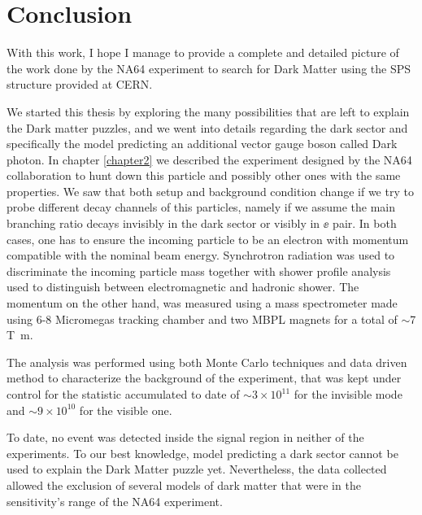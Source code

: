
\chapter{Conclusion} %

\label{chapter6}

With this work, I hope I manage to provide a complete and detailed picture of the work done by the NA64 experiment to search for Dark Matter using the SPS structure provided at CERN.

We started this thesis by exploring the many possibilities that are left to explain the Dark matter puzzles, and we went into details regarding the dark sector and specifically the model predicting an additional vector gauge boson called Dark photon. In chapter \ref{chapter2} we described the experiment designed by the NA64 collaboration to hunt down this particle and possibly other ones with the same properties. We saw that both setup and background condition change if we try to probe different decay channels of this particles, namely if we assume the main branching ratio decays invisibly in the dark sector or visibly in $\ee$ pair. In both cases, one has to ensure the incoming particle to be an electron with momentum compatible with the nominal beam energy. Synchrotron radiation was used to discriminate the incoming particle mass together with shower profile analysis used to distinguish between electromagnetic and hadronic shower. The momentum on the other hand, was measured using a mass spectrometer made using 6-8 Micromegas tracking chamber and two MBPL magnets for a total of $\sim$7 \si{\tesla\meter}.

The analysis was performed using both Monte Carlo techniques and data driven method to characterize the background of the experiment, that was kept under control for the statistic accumulated to date of $\sim 3 \times 10^{11}$ for the invisible mode and $\sim 9 \times 10^{10}$ for the visible one.

To date, no event was detected inside the signal region in neither of the experiments. To our best knowledge, model predicting a dark sector cannot be used to explain the Dark Matter puzzle yet. Nevertheless, the data collected allowed the exclusion of several models of dark matter that were in the sensitivity's  range  of the NA64 experiment. 


